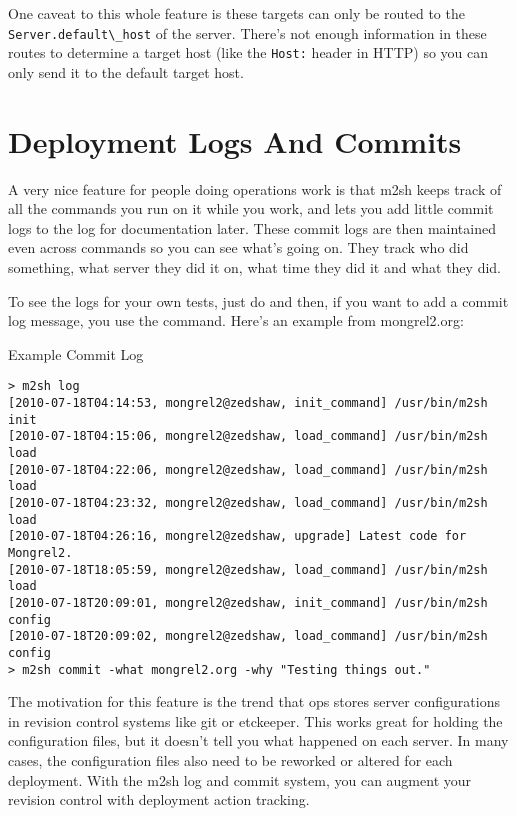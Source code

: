 One caveat to this whole feature is these targets can only be routed to the
\verb|Server.default\_host| of the server.  There's not enough information
in these routes to determine a target host (like the \verb|Host:| header in
HTTP) so you can only send it to the default target host.

\section{Deployment Logs And Commits}

A very nice feature for people doing operations work is that m2sh keeps track of all the
commands you run on it while you work, and lets you add little commit logs to the
log for documentation later.  These commit logs are then maintained even across
 commands so you can see what's going on.  They
track who did something, what server they did it on, what time they did it and what they
did.

To see the logs for your own tests, just do  and then,
if you want to add a commit log message, you use the  command.
Here's an example from mongrel2.org:

\begin{code}{Example Commit Log}
\begin{lstlisting}
> m2sh log
[2010-07-18T04:14:53, mongrel2@zedshaw, init_command] /usr/bin/m2sh init
[2010-07-18T04:15:06, mongrel2@zedshaw, load_command] /usr/bin/m2sh load
[2010-07-18T04:22:06, mongrel2@zedshaw, load_command] /usr/bin/m2sh load
[2010-07-18T04:23:32, mongrel2@zedshaw, load_command] /usr/bin/m2sh load
[2010-07-18T04:26:16, mongrel2@zedshaw, upgrade] Latest code for Mongrel2.
[2010-07-18T18:05:59, mongrel2@zedshaw, load_command] /usr/bin/m2sh load
[2010-07-18T20:09:01, mongrel2@zedshaw, init_command] /usr/bin/m2sh config
[2010-07-18T20:09:02, mongrel2@zedshaw, load_command] /usr/bin/m2sh config
> m2sh commit -what mongrel2.org -why "Testing things out."
\end{lstlisting}
\end{code}

The motivation for this feature is the trend that ops stores server configurations
in revision control systems like git or etckeeper.  This works great for holding the configuration
files, but it doesn't tell you what happened on each server.  In many cases, the configuration
files also need to be reworked or altered for each deployment.  With the m2sh log and commit
system, you can augment your revision control with deployment action tracking.


